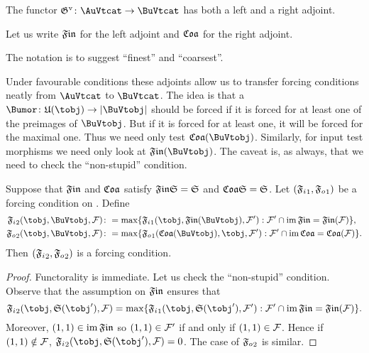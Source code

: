 \documentclass[%
12pt,%
arxiv,%
defaults
]{myclass}
\begin{document}
\begin{corollary}
The functor \(\mVo{\subfunc} \colon \AuVtcat \to \BuVtcat\) has both a left and a right adjoint. \noproof
\end{corollary}

\begin{defn}
Let us write \(\finfunc\) for the left adjoint and \(\coafunc\) for the right adjoint.
\end{defn}

The notation is to suggest ``finest'' and ``coarsest''.

Under favourable conditions these adjoints allow us to transfer forcing conditions neatly from \(\AuVtcat\) to \(\BuVtcat\).
The idea is that a \Bumor \(\Bumor \colon \ufunc(\tobj) \to \sabs{\BuVtobj}\) should be forced if it is forced for at least one of the preimages of \(\BuVtobj\).
But if it is forced for at least one, it will be forced for the maximal one.
Thus we need only test \(\coafunc(\BuVtobj)\).
Similarly, for input test morphisms we need only look at \(\finfunc(\BuVtobj)\).
The caveat is, as always, that we need to check the ``non\hyp{}stupid'' condition.

\begin{proposition}
Suppose that \(\finfunc\) and \(\coafunc\) satisfy \(\finfunc \sfunc = \sfunc\) and \(\coafunc \sfunc = \sfunc\).
Let \((\mAo{\iforce}, \mAo{\oforce})\) be a forcing condition on \AuVtobjs.
Define
%
\begin{align*}
  \mBo{\iforce}(\tobj, \BuVtobj, \m{F}) &\coloneqq \max\{\mAo{\iforce}(\tobj, \finfunc(\BuVtobj), \m{F}') : \m{F}' \cap \im \finfunc = \finfunc (\m{F})\}, \\
  \mBo{\oforce}(\tobj, \BuVtobj, \m{F}) &\coloneqq \max\{\mAo{\oforce}(\coafunc(\BuVtobj), \tobj, \m{F}') : \m{F}' \cap \im \coafunc = \coafunc (\m{F})\}.
\end{align*}
%
Then \((\mBo{\iforce}, \mBo{\oforce})\) is a forcing condition.
\end{proposition}

\begin{proof}
Functorality is immediate.
Let us check the ``non\hyp{}stupid'' condition.
Observe that the assumption on \(\finfunc\) ensures that
%
\[
  \mBo{\iforce}(\tobj, \sfunc(\tobj'), \m{F}) = \max\{\mAo{\iforce}(\tobj, \sfunc(\tobj'), \m{F}') : \m{F}' \cap \im \finfunc = \finfunc (\m{F})\}.
\]
%
Moreover, \((1,1) \in \im\finfunc\) so \((1,1) \in \mathcal{F}'\) if and only if \((1, 1) \in \mathcal{F}\).
Hence if \((1,1) \notin \mathcal{F}\), \(\mBo{\iforce}(\tobj, \sfunc(\tobj'), \m{F}) = 0\).
The case of \(\mBo{\oforce}\) is similar.
\end{proof}
\end{document}
